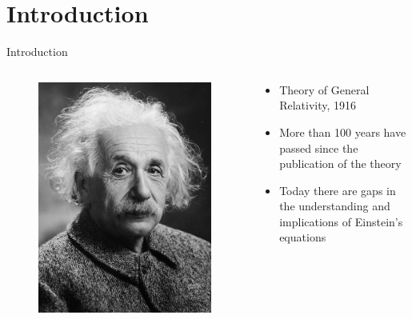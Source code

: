 \documentclass{beamer}
\begin{document}
\section{Introduction}
\begin{frame}{Introduction}
	\begin{columns}
		\begin{column}{0.5\textwidth}
			\begin{figure}[h]
				\centering
				\includegraphics[width=0.9\linewidth]{images/Albert_Einstein_Head}
			\end{figure}
		\end{column}
		\begin{column}{0.5\textwidth}
			\begin{itemize}
				\item Theory of General Relativity, 1916
				\item More than 100 years have passed since the publication of the theory
				\item Today there are gaps in the understanding and implications of Einstein's equations
			\end{itemize}
		\end{column}
	\end{columns}
\end{frame}
\end{document}
